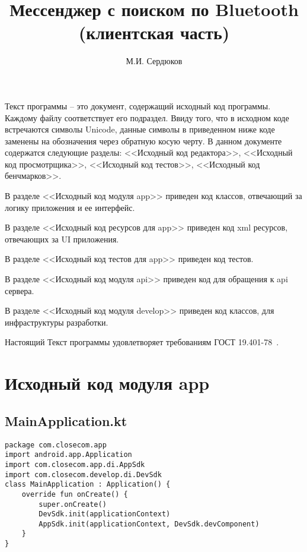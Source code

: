 \documentclass[listing]{espd}
\author{М.И. Сердюков}
\title{Мессенджер с поиском по Bluetooth\\(клиентская часть)}
\begin{document}
\annotation

Текст программы -- это документ, содержащий исходный код программы. Каждому файлу соответствует его подраздел. Ввиду того, что в исходном коде встречаются символы Unicode, данные символы в приведенном ниже коде заменены на обозначения через обратную косую черту. В данном документе содержатся следующие разделы: <<Исходный код редактора>>, <<Исходный код просмотрщика>>, <<Исходный код тестов>>, <<Исходный код бенчмарков>>.

В разделе <<Исходный код модуля app>> приведен код классов, отвечающий за логику приложения и ее интерфейс.

В разделе <<Исходный код ресурсов для app>> приведен код xml ресурсов, отвечающих за UI приложения.

В разделе <<Исходный код тестов для app>> приведен код тестов.

В разделе <<Исходный код модуля api>> приведен код для обращения к api сервера.

В разделе <<Исходный код модуля develop>> приведен код классов, для инфраструктуры разработки.

Настоящий Текст программы удовлетворяет требованиям ГОСТ 19.401-78~\cite{espd401}.

\tableofcontents
\section{Исходный код модуля app}

\subsection{MainApplication.kt}
\begin{verbatim}
package com.closecom.app
import android.app.Application
import com.closecom.app.di.AppSdk
import com.closecom.develop.di.DevSdk
class MainApplication : Application() {
    override fun onCreate() {
        super.onCreate()
        DevSdk.init(applicationContext)
        AppSdk.init(applicationContext, DevSdk.devComponent)
    }
}
\end{verbatim}
\end{document}
